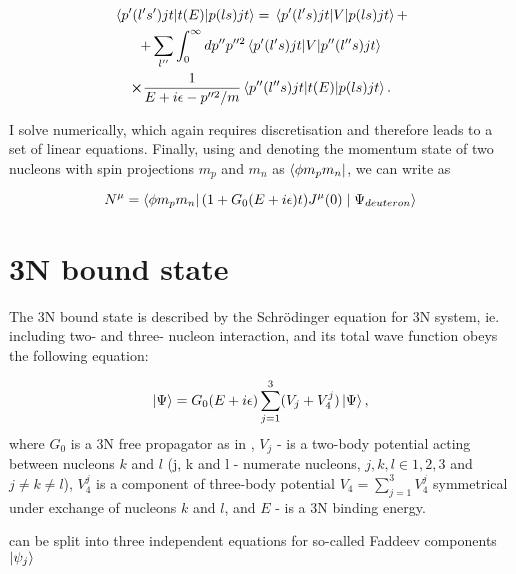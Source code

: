     \begin{multline}
        \matrixel{p^\prime (l^\prime s^\prime)jt}{t(E)}{p(ls)jt} = 
        \matrixel{p^\prime (l^\prime s)jt}{V}{p(ls)jt} + \\
        +\sum_{l^{\prime\prime}} \int_0^\infty dp^{\prime \prime} p^{\prime \prime 2}
        \matrixel{p^\prime (l^\prime s)jt}{V}{p^{\prime\prime}(l^{\prime\prime} s)jt} \\
        \cross \frac{1}{E + i\epsilon - p^{\prime \prime 2}/m}
        \matrixel{p^{\prime \prime} (l^{\prime \prime} s)jt}{t(E)}{p(l s)jt}.      
        \label{lse_pwd_reduced}
    \end{multline}

    I solve  numerically, which again requires discretisation
    and therefore leads to a set of linear equations.
    Finally, using  and denoting the momentum state of two nucleons
    with spin projections $m_p$ and $m_n$ as $\bra{\phi m_p m_n}$, we can write  as
    
    \begin{equation}
        N^\mu = \bra{\phi m_p m_n} (1 + G_0(E + i\epsilon) t) J^\mu(0) \mid \Psi_{deuteron} \rangle
        \label{main_top}
    \end{equation}

    
\section{3N bound state}

    The 3N bound state is described by the Schr\"{o}dinger equation for 3N system,
    ie. including two- and three- nucleon interaction,
    and its total wave function obeys the following equation:

    \begin{equation}
        \ket{\Psi} = G_0(E+i\epsilon)\sum_{j=1}^3 (V_j + V_4^j) \ket{\Psi},
        \label{psi3_total}
    \end{equation}
    where $G_0$ is a 3N free propagator as in , $V_j$ - is a two-body potential
    acting between nucleons $k$ and $l$ (j, k and l - numerate nucleons, $j,k,l \in {1,2,3}$ and $j \neq k \neq l$),
    $V_4^j$ is a component of three-body potential $V_4 = \sum_{j=1}^3 V_4^j$
    symmetrical under exchange of nucleons $k$ and $l$,
    and $E$ - is a 3N binding energy.

     can be split into three independent equations for
    so-called Faddeev components $\ket{\psi_j}$

